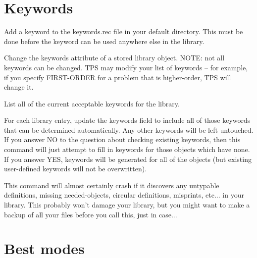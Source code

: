 \section{Keywords}

\begin{description} 
\item[ADD-KEYWORD]  
Add a keyword to the keywords.rec file in your default directory.
This must be done before the keyword can be used anywhere else in the 
library.

\item[CHANGE-KEYWORDS]  
Change the keywords attribute of a stored library object.
NOTE: not all keywords can be changed. TPS may modify your list of
keywords -- for example, if you specify FIRST-ORDER for a problem
that is higher-order, TPS will change it.

\item[SHOW-KEYWORDS]  
List all of the current acceptable keywords for the library.

\item[UPDATE-KEYWORDS]  
For each library entry, update the keywords field
to include all of those keywords that can be determined automatically.
Any other keywords will be left untouched.
If you answer NO to the question about checking existing keywords, then 
this command will just attempt to fill in keywords for those objects 
which have none. If you answer YES, keywords will be generated for all 
of the objects (but existing user-defined  keywords will not be overwritten).

This command will almost certainly crash if it discovers any untypable 
definitions, missing needed-objects, circular definitions, misprints, etc...
in your library.
This probably won't damage your library, but you might want to make
a backup of all your files before you call this, just in case...
\item
\end{description}

\section{Best modes}

